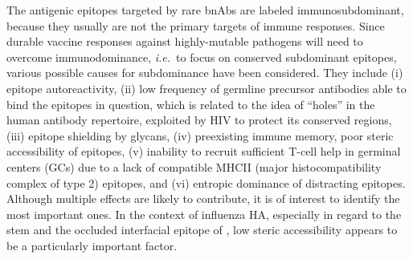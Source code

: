 \documentclass[utf8]{frontiersHLTH}%
\newcommand{\cred}[1]{#1} %
\def\ie {{\it i.e.}}
\begin{document}
The antigenic epitopes targeted by rare bnAbs are labeled immunosubdominant, because
they usually are not the primary targets of immune responses.
Since durable vaccine responses against highly-mutable pathogens will need
to overcome immunodominance, \ie~to focus on conserved subdominant epitopes,
various possible causes for subdominance have been considered. They include
(i) epitope autoreactivity,\cite{bajic19a} (ii) low frequency of \cred{germline} precursor
antibodies able to bind the epitopes in question,\cite{andrews15}
\cred{which is related to the idea of ``holes'' in the human antibody repertoire, exploited by HIV to protect its conserved regions\cite{xiao09},}
(iii) epitope shielding by glycans,\cite{bajic19} (iv) preexisting immune
memory,\cite{andrews15,arevalo20} poor steric accessibility of
epitopes\cite{amitai20}, (v) inability to recruit sufficient T-cell help
in germinal centers (GCs) due to a lack of compatible MHCII (major histocompatibility complex of type 2) epitopes,\cite{tan19}
and (vi) entropic dominance of distracting epitopes.\cite{wang17,amitai20,glanville20}
Although multiple effects are likely to contribute, it
is of interest to identify the most important ones. In the
context of influenza HA, especially in regard to the stem and the occluded
interfacial epitope of \citet{watanabe19}, low steric accessibility appears
to be a particularly important factor.
\end{document}
